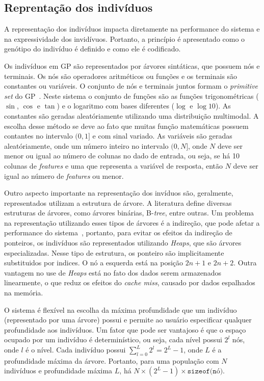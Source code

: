 \documentclass[a4paper]{paper}
\begin{document}
\subsection{Reprentação dos indivíduos} \label{subsec:representacao}
A representação dos indivíduos impacta diretamente na performance do sistema e
na expressividade dos invidívuos. Portanto, a princípio é apresentado como o
genótipo do indivíduo é definido e como ele é codificado.


Os indivíduos em GP são representados por árvores sintáticas, que possuem nós e
terminais. Os nós são operadores aritméticos ou funções e os terminais são
constantes ou variáveis. O conjunto de nós e terminais juntos formam o
\textit{primitive set} do GP~\citep{poli2008}. Neste sistema o conjunto de
funções são as funções trigonométricas ($\sin$, $\cos$ e $\tan$) e o logaritmo
com bases diferentes ($\log$ e $\log10$). As constantes são geradas
aleatóriamente utilizando uma distribuição multimodal. A escolha desse método se
deve ao fato que muitas função matemáticas possuem contantes no intervalo $(0,
1]$ e com sinal variado.  As variáveis são geradas aleatóriamente, onde um
  número inteiro no intervalo $(0, N]$, onde $N$ deve ser menor ou igual ao
    número de colunas no dado de entrada, ou seja, se há 10 colunas de
    \textit{features} e uma que representa a variável de resposta, então $N$
    deve ser igual ao número de \textit{features} ou menor.

Outro aspecto importante na representação dos invíduos são, geralmente,
representados utilizam a estrutura de árvore. A literatura define diversas
estruturas de árvores, como árvores binárias, B-\textit{tree}, entre outras. Um
problema na representação utilizando esses tipos de árvores é a indireção, que
pode afetar a performance do sistema~\citep{faria2013}, portanto, para evitar os efeitos da
indireção de ponteiros, os indivíduos são representados utilizando
\textit{Heaps}, que são árvores especializadas. Nesse tipo de estrutura, os
ponteiro são implicitamente substituidos por indices. O nó a esquerda está na
posição $2n+1$ e $2n + 2$. Outra vantagem no use de \textit{Heaps} está no fato
dos dados serem armazenados linearmente, o que reduz os efeitos do \textit{cache
  miss}, causado por dados espalhados na memória.

O sistema é flexível na escolha da máxima profundidade que um indivíduo
(representado por uma árvore) possui e permite ao usuário especificar qualquer
profundidade aos indivíduos.  Um fator que pode ser vantajoso é que o espaço
ocupado por um indivíduo é determinístico, ou seja, cada nível possui $2^l$ nós,
onde $l$ é o nível.  Cada indivíduo possui $\sum_{l=0}^{L}2^l=2^{L}-1$, onde $L$
é a profundidade máxima da árvore. Portanto, para uma população com $N$
indivíduos e profundidade máxima $L$, há
$N\times(2^{L}-1)\times\texttt{sizeof(nó)}$.
\end{document}
